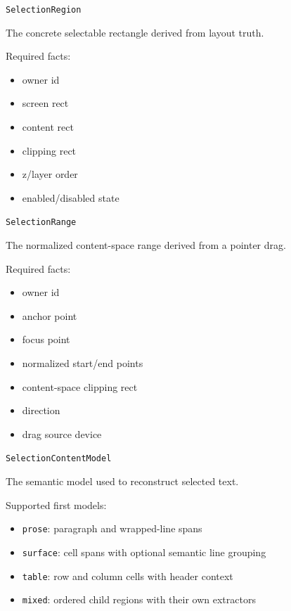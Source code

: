 \texttt{S\allowbreak{}e\allowbreak{}l\allowbreak{}e\allowbreak{}c\allowbreak{}t\allowbreak{}i\allowbreak{}o\allowbreak{}n\allowbreak{}R\allowbreak{}e\allowbreak{}g\allowbreak{}i\allowbreak{}o\allowbreak{}n}

The concrete selectable rectangle derived from layout truth.

Required facts:

\begin{itemize}
\tightlist
\item
  owner id
\item
  screen rect
\item
  content rect
\item
  clipping rect
\item
  z/layer order
\item
  enabled/disabled state
\end{itemize}

\texttt{S\allowbreak{}e\allowbreak{}l\allowbreak{}e\allowbreak{}c\allowbreak{}t\allowbreak{}i\allowbreak{}o\allowbreak{}n\allowbreak{}R\allowbreak{}a\allowbreak{}n\allowbreak{}g\allowbreak{}e}

The normalized content-space range derived from a pointer drag.

Required facts:

\begin{itemize}
\tightlist
\item
  owner id
\item
  anchor point
\item
  focus point
\item
  normalized start/end points
\item
  content-space clipping rect
\item
  direction
\item
  drag source device
\end{itemize}

\texttt{S\allowbreak{}e\allowbreak{}l\allowbreak{}e\allowbreak{}c\allowbreak{}t\allowbreak{}i\allowbreak{}o\allowbreak{}n\allowbreak{}C\allowbreak{}o\allowbreak{}n\allowbreak{}t\allowbreak{}e\allowbreak{}n\allowbreak{}t\allowbreak{}M\allowbreak{}o\allowbreak{}d\allowbreak{}e\allowbreak{}l}

The semantic model used to reconstruct selected text.

Supported first models:

\begin{itemize}
\tightlist
\item
  \texttt{p\allowbreak{}r\allowbreak{}o\allowbreak{}s\allowbreak{}e}: paragraph and wrapped-line spans
\item
  \texttt{s\allowbreak{}u\allowbreak{}r\allowbreak{}f\allowbreak{}a\allowbreak{}c\allowbreak{}e}: cell spans with optional semantic line grouping
\item
  \texttt{t\allowbreak{}a\allowbreak{}b\allowbreak{}l\allowbreak{}e}: row and column cells with header context
\item
  \texttt{m\allowbreak{}i\allowbreak{}x\allowbreak{}e\allowbreak{}d}: ordered child regions with their own extractors
\end{itemize}

